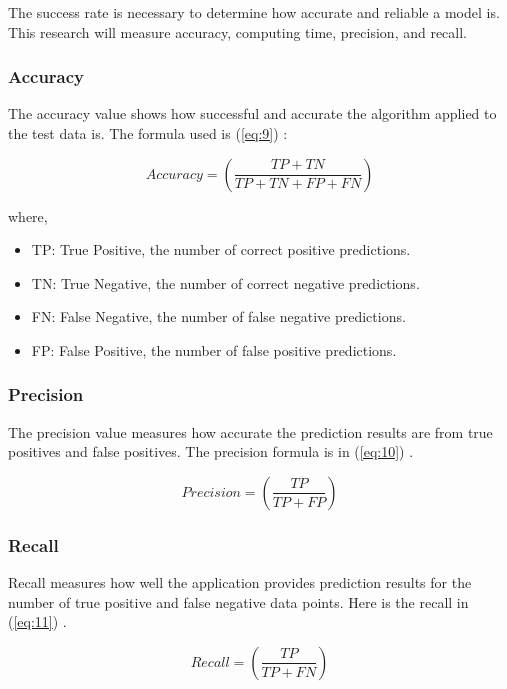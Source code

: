 \documentclass[10pt,a4paper]{article}
\begin{document}
The success rate is necessary to determine how accurate and reliable a model is. This research will measure accuracy, computing time, precision, and recall.

\subsubsection{Accuracy}

The accuracy value shows how successful and accurate the algorithm applied to the test data is. The formula used is (\ref{eq:9}) \cite{Nyasulu2023}:

\begin{equation} \label{eq:9}
    Accuracy=(\frac{TP+TN}{TP+TN+FP+FN})
\end{equation}

where,
\begin{itemize}
    \item TP: True Positive, the number of correct positive predictions.
    \item TN: True Negative, the number of correct negative predictions.
    \item FN: False Negative, the number of false negative predictions.
    \item FP: False Positive, the number of false positive predictions.
\end{itemize}

\subsubsection{Precision}

The precision value measures how accurate the prediction results are from true positives and false positives. The precision formula is in (\ref{eq:10}) \cite{Nyasulu2023}.

\begin{equation} \label{eq:10}
Precision=(\frac{TP}{TP+FP})
\end{equation}

\subsubsection{Recall}

Recall measures how well the application provides prediction results for the number of true positive and false negative data points. Here is the recall in (\ref{eq:11}) \cite{Nyasulu2023}.

\begin{equation} \label{eq:11}
Recall=(\frac{TP}{TP+FN})
\end{equation}
\end{document}
